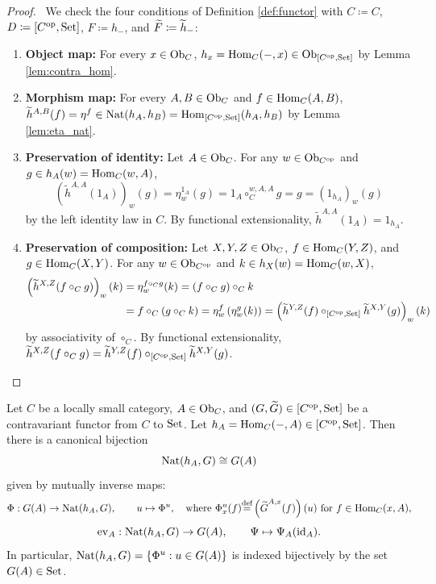 \documentclass[10pt,a4paper]{article}
\renewcommand{\myprf}{\begin{proof}}
\renewcommand{\myqed}{\end{proof}}
\begin{document}
\myprf\ We check the four conditions of Definition \ref{def:functor} with $C \coloneqq C$, $D \coloneqq [C^{\textrm{op}},{\textrm{Set}}]$, $F \coloneqq h_-$, and ${\widetilde{F}\textrm{}} \coloneqq \widetilde{h}_-$:
\begin{enumerate}
\item \textbf{Object map:} For every $x \in {\textrm{Ob}}_C$, $h_x = {\textrm{Hom}}_C(-,x) \in {\textrm{Ob}}_{[C^{\textrm{op}},{\textrm{Set}}]}$ by Lemma \ref{lem:contra_hom}.
\item \textbf{Morphism map:} For every $A,B \in {\textrm{Ob}}_C$ and $f \in {\textrm{Hom}}_C(A,B)$, $\widetilde{h}^{A,B}(f) = \eta^f \in {\textrm{Nat}}(h_A, h_B) = {\textrm{Hom}}_{[C^{\textrm{op}},{\textrm{Set}}]}(h_A, h_B)$ by Lemma \ref{lem:eta_nat}.
\item \textbf{Preservation of identity:} Let $A \in {\textrm{Ob}}_C$. For any $w \in {\textrm{Ob}}_{C^{\textrm{op}}}$ and $g \in h_A(w) = {\textrm{Hom}}_C(w,A)$,
$$\left(\widetilde{h}^{A,A}(1_A)\right)_w(g) = \eta^{1_A}_w(g) = 1_A \circ_C^{w,A,A} g = g = \left(1_{h_A}\right)_w(g)$$
by the left identity law in $C$. By functional extensionality, $\widetilde{h}^{A,A}(1_A) = 1_{h_A}$.
\item \textbf{Preservation of composition:} Let $X,Y,Z \in {\textrm{Ob}}_C$, $f \in {\textrm{Hom}}_C(Y,Z)$, and $g \in {\textrm{Hom}}_C(X,Y)$. For any $w \in {\textrm{Ob}}_{C^{\textrm{op}}}$ and $k \in h_X(w) = {\textrm{Hom}}_C(w,X)$,
\begin{align*}
\left(\widetilde{h}^{X,Z}(f \circ_C g)\right)_w(k) &= \eta^{f \circ_C g}_w(k) = (f \circ_C g) \circ_C k \\
&= f \circ_C (g \circ_C k) = \eta^f_w\left(\eta^g_w(k)\right) = \left(\widetilde{h}^{Y,Z}(f) \circ_{[C^{\textrm{op}},{\textrm{Set}}]} \widetilde{h}^{X,Y}(g)\right)_w(k)
\end{align*}
by associativity of $\circ_C$. By functional extensionality, $\widetilde{h}^{X,Z}(f \circ_C g) = \widetilde{h}^{Y,Z}(f) \circ_{[C^{\textrm{op}},{\textrm{Set}}]} \widetilde{h}^{X,Y}(g)$.
\end{enumerate}
\myqed
\begin{theorem}\label{thm:yoneda_contra}
Let $C$ be a locally small category, $A \in {\textrm{Ob}}_C$, and $(G, {\widetilde{G}\textrm{}}) \in [C^{\textrm{op}}, {\textrm{Set}}]$ be a contravariant functor from $C$ to ${\textrm{Set}}$. Let $h_A = {\textrm{Hom}}_C(-,A) \in [C^{\textrm{op}}, {\textrm{Set}}]$. Then there is a canonical bijection
$${\textrm{Nat}}(h_A, G) \cong G(A)$$
given by mutually inverse maps:
$$\Phi : G(A) \to {\textrm{Nat}}(h_A, G), \qquad u \mapsto \Phi^u, \quad \textrm{where } \Phi^u_x(f) {\stackrel{{\textrm{def}}}{=}} \left({\widetilde{G}\textrm{}}^{A,x}(f)\right)(u) \textrm{ for } f \in {\textrm{Hom}}_C(x,A),$$
$$\mathrm{ev}_A : {\textrm{Nat}}(h_A, G) \to G(A), \qquad \Psi \mapsto \Psi_A({\textrm{id}}_A).$$
In particular, ${\textrm{Nat}}(h_A, G) = \{\Phi^u : u \in G(A)\}$ is indexed bijectively by the set $G(A) \in {\textrm{Set}}$.
\end{theorem}
\end{document}
